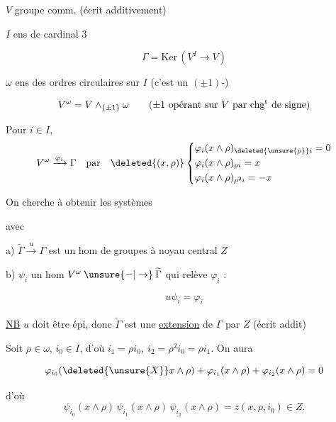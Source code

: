 
$V$ groupe comm. (écrit additivement)

$I$ ens de cardinal 3

\[
 \Gamma=\mathrm{Ker}\,(V^I\to V)
\]

$\omega$ ens des  ordres circulaires sur $I$ (c'est un $(\pm1)$-)

\[
 V^\omega=V\mathbin{\wedge}_{\{\pm1\}}\omega
 \qquad(\pm1\text{ opérant sur }V\text{ par chg}\textsuperscript{t}\text{ de signe})
\]

Pour $i\in I$, \unsure{---}
\[
 V^\omega\xrightarrow{\varphi_i}\Gamma\quad\text{par}\quad\deleted{(x,\rho)}
 \left\{\begin{aligned}
 &\varphi_i(x\wedge\rho)_{\deleted{\unsure{\rho}}i}=0\\
 &\varphi_i(x\wedge\rho)_{\rho i}=x\\
 &\varphi_i(x\wedge\rho)_{\rho^2 i}=-x
 \end{aligned}\right.
\]


On cherche à obtenir les systèmes



avec

 a) $\widetilde\Gamma\xrightarrow{u}\Gamma$ est un hom de groupes à noyau central $Z$

b) $\psi_i$ un hom $V^\omega\mathbin{\unsure{-|\to}}\widetilde\Gamma$ qui relève $\varphi_i$ :

\[
 u\psi_i=\varphi_i
\]

\uline{NB} $u$ doit être épi, donc $\widetilde\Gamma$ est une \uline{extension} de $\Gamma$ par $Z$ (écrit addit\textsuperscript{})

Soit $\rho\in\omega$, $i_0\in I$, d'où $i_1=\rho i_0,\ i_2=\rho^2i_0=\rho i_1$. On aura

\[
 \varphi_{i_0}(\deleted{\unsure{X}}x\wedge\rho)+\varphi_{i_1}(x\wedge\rho)+\varphi_{i_2}(x\wedge\rho)=0
\]

d'où
\[
 \psi_{i_0}(x\wedge\rho)\,\psi_{i_1}(x\wedge\rho)\,\psi_{i_2}(x\wedge\rho)
 =z(x,\rho,i_0)\in Z.
\]

